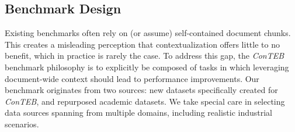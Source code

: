 \begin{table}[ht]
  \caption[ConTEB dataset details]{Merged \emph{ConTEB} dataset details. Controlled datasets are highlighted in {\color{navyblue}\textbf{bold blue}}. NanoBEIR values are summed over the 13 datasets that compose it.}
  \label{table:merged_conteb}
\end{table}



\subsection{Benchmark Design}

Existing benchmarks often rely on (or assume) self-contained document chunks. This creates a misleading perception that contextualization offers little to no benefit, which in practice is rarely the case. To address this gap, the \emph{ConTEB} benchmark philosophy is to explicitly be composed of tasks in which leveraging document-wide context should lead to performance improvements. Our benchmark originates from two sources: new datasets specifically created for \emph{ConTEB}, and repurposed academic datasets. We take special care in selecting data sources spanning from multiple domains, including realistic industrial scenarios.

